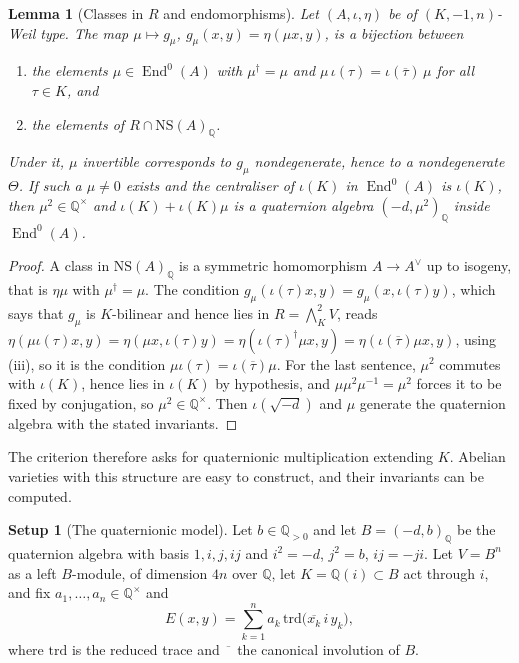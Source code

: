 \documentclass[11pt,reqno]{amsart}
\theoremstyle{plain}
\newtheorem{lemma}[theorem]{Lemma}
\theoremstyle{definition}
\newtheorem{setupenv}[theorem]{Setup}
\theoremstyle{remark}
\newcommand{\QQ}{\mathbb{Q}}
\newcommand{\Av}{A^{\vee}}
\newcommand{\NS}{\mathrm{NS}}
\DeclareMathOperator{\End}{End}
\newcommand{\bbar}[1]{\overline{#1}}
\begin{document}
\begin{lemma}[Classes in $R$ and endomorphisms]\label{lem:Rendomorphism}
Let $(A,\iota,\eta)$ be of $(K,-1,n)$-Weil type. The map $\mu\mapsto
g_{\mu}$, $g_{\mu}(x,y)=\eta(\mu x,y)$, is a bijection between
\begin{enumerate}[label=\textup{(\alph*)},nosep]
\item the elements $\mu\in\End^{0}(A)$ with $\mu^{\dagger}=\mu$ and
  $\mu\,\iota(\tau)=\iota(\bbar{\tau})\,\mu$ for all $\tau\in K$, and
\item the elements of $R\cap\NS(A)_{\QQ}$.
\end{enumerate}
Under it, $\mu$ invertible corresponds to $g_{\mu}$ nondegenerate, hence to a
nondegenerate $\Theta$. If such a $\mu\ne0$ exists and the centraliser of
$\iota(K)$ in $\End^{0}(A)$ is $\iota(K)$, then $\mu^{2}\in\QQ^{\times}$ and
$\iota(K)+\iota(K)\mu$ is a quaternion algebra $(-d,\mu^{2})_{\QQ}$ inside
$\End^{0}(A)$.
\end{lemma}

\begin{proof}
A class in $\NS(A)_{\QQ}$ is a symmetric homomorphism $A\to\Av$ up to isogeny,
that is $\eta\mu$ with $\mu^{\dagger}=\mu$. The condition
$g_{\mu}(\iota(\tau)x,y)=g_{\mu}(x,\iota(\tau)y)$, which says that $g_{\mu}$ is
$K$-bilinear and hence lies in $R=\bigwedge^{2}_{K}V$, reads
$\eta(\mu\iota(\tau)x,y)=\eta(\mu x,\iota(\tau)y)=\eta(\iota(\tau)^{\dagger}\mu
x,y)=\eta(\iota(\bbar{\tau})\mu x,y)$, using (iii), so it
is the condition $\mu\iota(\tau)=\iota(\bbar{\tau})\mu$. For the last sentence,
$\mu^{2}$ commutes with $\iota(K)$, hence lies in $\iota(K)$ by hypothesis, and
$\mu\mu^{2}\mu^{-1}=\mu^{2}$ forces it to be fixed by conjugation, so
$\mu^{2}\in\QQ^{\times}$. Then $\iota(\sqrt{-d})$ and $\mu$ generate the
quaternion algebra with the stated invariants.
\end{proof}

The criterion therefore asks for quaternionic multiplication extending $K$.
Abelian varieties with this structure are easy to construct, and their
invariants can be computed.

\begin{setupenv}[The quaternionic model]\label{setup:quat}
Let $b\in\QQ_{>0}$ and let $B=(-d,b)_{\QQ}$ be the quaternion algebra with
basis $1,i,j,ij$ and $i^{2}=-d$, $j^{2}=b$, $ij=-ji$. Let
$V=B^{n}$ as a left $B$-module, of dimension $4n$ over $\QQ$, let
$K=\QQ(i)\subset B$ act through $i$, and fix $a_{1},\dots,a_{n}\in\QQ^{\times}$
and
\begin{equation}\label{eq:quatE}
  E(x,y)=\sum_{k=1}^{n}a_{k}\,\mathrm{trd}\bigl(\bbar{x_{k}}\,i\,y_{k}\bigr),
\end{equation}
where $\mathrm{trd}$ is the reduced trace and $\bbar{\phantom{x}}$ the
canonical involution of $B$.
\end{setupenv}
\end{document}
